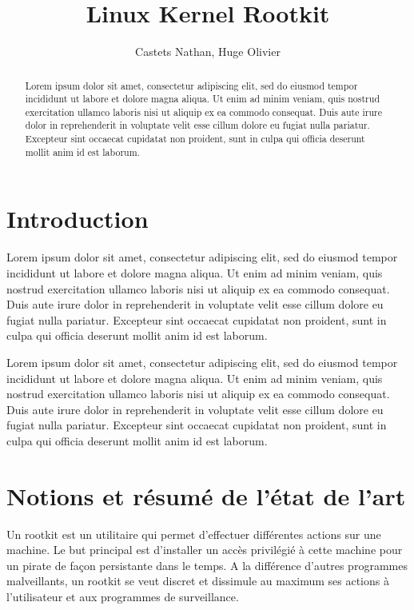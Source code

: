 \documentclass[journal, a4paper]{IEEEtran}
\begin{document}
	\title{Linux Kernel Rootkit}
	\author{Castets Nathan, Huge Olivier}
	\maketitle

\begin{abstract}
	Lorem ipsum dolor sit amet, consectetur adipiscing elit, sed do eiusmod tempor incididunt ut labore et dolore magna aliqua. Ut enim ad minim veniam, quis nostrud exercitation ullamco laboris nisi ut aliquip ex ea commodo consequat. Duis aute irure dolor in reprehenderit in voluptate velit esse cillum dolore eu fugiat nulla pariatur. Excepteur sint occaecat cupidatat non proident, sunt in culpa qui officia deserunt mollit anim id est laborum.
\end{abstract}

\section{Introduction}

Lorem ipsum dolor sit amet, consectetur adipiscing elit, sed do eiusmod tempor incididunt ut labore et dolore magna aliqua. Ut enim ad minim veniam, quis nostrud exercitation ullamco laboris nisi ut aliquip ex ea commodo consequat. Duis aute irure dolor in reprehenderit in voluptate velit esse cillum dolore eu fugiat nulla pariatur. Excepteur sint occaecat cupidatat non proident, sunt in culpa qui officia deserunt mollit anim id est laborum.

Lorem ipsum dolor sit amet, consectetur adipiscing elit, sed do eiusmod tempor incididunt ut labore et dolore magna aliqua. Ut enim ad minim veniam, quis nostrud exercitation ullamco laboris nisi ut aliquip ex ea commodo consequat. Duis aute irure dolor in reprehenderit in voluptate velit esse cillum dolore eu fugiat nulla pariatur. Excepteur sint occaecat cupidatat non proident, sunt in culpa qui officia deserunt mollit anim id est laborum.

\section{Notions et résumé de l'état de l'art}

Un rootkit est un utilitaire qui permet d'effectuer différentes actions sur une machine. Le but principal est d'installer un accès privilégié à cette machine pour un pirate de façon persistante dans le temps. A la différence d'autres programmes malveillants, un rootkit se veut discret et dissimule au maximum ses actions à l'utilisateur et aux programmes de surveillance.
\end{document}
